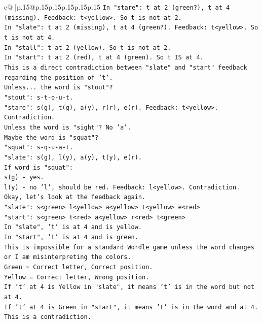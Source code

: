 \documentclass{article}
\begin{document}
{\begin{supertabular}{c@{$\;$}|p{.15\linewidth}@{}p{.15\linewidth}p{.15\linewidth}p{.15\linewidth}p{.15\linewidth}p{.15\linewidth}}
{{{\texttt{In "stare": t at 2 (green?), t at 4 (missing). Feedback: t<yellow>. So t is not at 2.} \\
\texttt{In "slate": t at 2 (missing), t at 4 (green?). Feedback: t<yellow>. So t is not at 4.} \\
\texttt{In "stall": t at 2 (yellow). So t is not at 2.} \\
\texttt{In "start": t at 2 (red), t at 4 (green). So t IS at 4.} \\
\texttt{This is a direct contradiction between "slate" and "start" feedback regarding the position of 't'.} \\
\texttt{Unless... the word is "stout"?} \\
\texttt{"stout": s{-}t{-}o{-}u{-}t.} \\
\texttt{"stare": s(g), t(g), a(y), r(r), e(r). Feedback: t<yellow>. Contradiction.} \\
\texttt{Unless the word is "sight"? No 'a'.} \\
\texttt{Maybe the word is "squat"?} \\
\texttt{"squat": s{-}q{-}u{-}a{-}t.} \\
\texttt{"slate": s(g), l(y), a(y), t(y), e(r).} \\
\texttt{If word is "squat":} \\
\texttt{s(g) {-} yes.} \\
\texttt{l(y) {-} no 'l', should be red. Feedback: l<yellow>. Contradiction.} \\
\texttt{Okay, let's look at the feedback again.} \\
\texttt{"slate": s<green> l<yellow> a<yellow> t<yellow> e<red>} \\
\texttt{"start": s<green> t<red> a<yellow> r<red> t<green>} \\
\texttt{In "slate", 't' is at 4 and is yellow.} \\
\texttt{In "start", 't' is at 4 and is green.} \\
\texttt{This is impossible for a standard Wordle game unless the word changes or I am misinterpreting the colors.} \\
\texttt{Green = Correct letter, Correct position.} \\
\texttt{Yellow = Correct letter, Wrong position.} \\
\texttt{If 't' at 4 is Yellow in "slate", it means 't' is in the word but not at 4.} \\
\texttt{If 't' at 4 is Green in "start", it means 't' is in the word and at 4.} \\
\texttt{This is a contradiction.} \\
}}}
\end{supertabular}}
\end{document}

